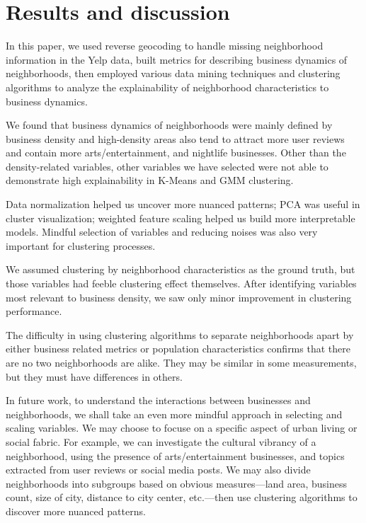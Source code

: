 \documentclass[compsoc]{IEEEtran}
\begin{document}
\section{Results and discussion}

In this paper, we used reverse geocoding to handle missing neighborhood information in the Yelp data, built metrics for describing business dynamics of neighborhoods, then employed various data mining techniques and clustering algorithms to analyze the explainability of neighborhood characteristics to business dynamics.

We found that business dynamics of neighborhoods were mainly defined by business density and high-density areas also tend to attract more user reviews and contain more arts/entertainment, and nightlife businesses. Other than the density-related variables, other variables we have selected were not able to demonstrate high explainability in K-Means and GMM clustering.

Data normalization helped us uncover more nuanced patterns; PCA was useful in cluster visualization; weighted feature scaling helped us build more interpretable models. Mindful selection of variables and reducing noises was also very important for clustering processes.

 We assumed clustering by neighborhood characteristics as the ground truth, but those variables had feeble clustering effect themselves. After identifying variables most relevant to business density, we saw only minor improvement in clustering performance.

The difficulty in using clustering algorithms to separate neighborhoods apart by either business related metrics or population characteristics confirms that there are no two neighborhoods are alike. They may be similar in some measurements, but they must have differences in others.

In future work, to understand the interactions between businesses and neighborhoods, we shall take an even more mindful approach in selecting and scaling variables. We may choose to focuse on a specific aspect of urban living or social fabric. For example, we can investigate the cultural vibrancy of a neighborhood, using the presence of arts/entertainment businesses, and topics extracted from user reviews or social media posts. We may also divide neighborhoods into subgroups based on obvious measures---land area, business count, size of city, distance to city center, etc.---then use clustering algorithms to discover more nuanced patterns.
\end{document}

